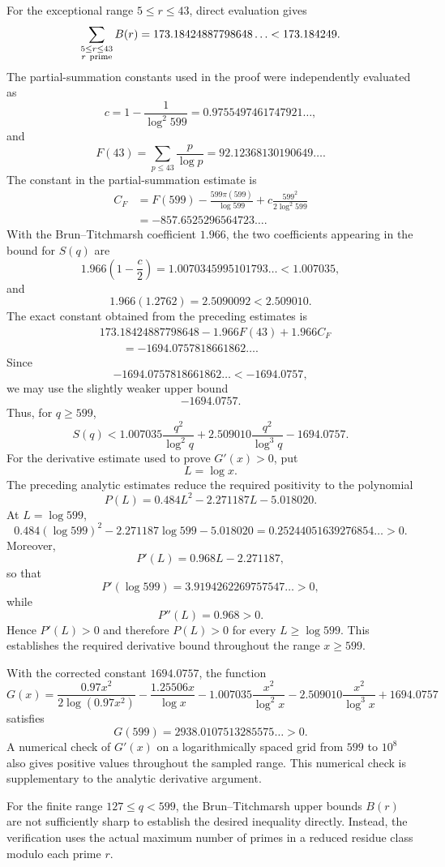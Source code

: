 \documentclass[11pt,a4paper]{article}
\theoremstyle{definition}
\theoremstyle{remark}
\begin{document}
For the exceptional range $5\le r\le43$, direct evaluation gives
\[
\sum_{\substack{5\le r\le43\\r\ {\rm prime}}}B(r)
=
173.18424887798648\ldots
<
173.184249.
\]
The partial-summation constants used in the proof were independently
evaluated as
\[
c
=
1-\frac1{\log^2 599}
=
0.9755497461747921\ldots,
\]
and
\[
F(43)
=
\sum_{p\le43}\frac p{\log p}
=
92.12368130190649\ldots.
\]
The constant in the partial-summation estimate is
\[
\begin{aligned}
C_F
&=
F(599)
-\frac{599\pi(599)}{\log599}
+
c\frac{599^2}{2\log^2 599}\\
&=
-857.6525296564723\ldots.
\end{aligned}
\]
With the Brun--Titchmarsh coefficient $1.966$, the two coefficients
appearing in the bound for $S(q)$ are
\[
1.966\left(1-\frac c2\right)
=
1.0070345995101793\ldots
<
1.007035,
\]
and
\[
1.966(1.2762)
=
2.5090092
<
2.509010.
\]
The exact constant obtained from the preceding estimates is
\[
\begin{aligned}
&173.18424887798648
-1.966F(43)
+1.966C_F\\
&\qquad=
-1694.0757818661862\ldots.
\end{aligned}
\]
Since
\[
-1694.0757818661862\ldots<-1694.0757,
\]
we may use the slightly weaker upper bound
\[
-1694.0757.
\]
Thus, for $q\ge599$,
\[
S(q)
<
1.007035\frac{q^2}{\log^2q}
+
2.509010\frac{q^2}{\log^3q}
-1694.0757.
\]
For the derivative estimate used to prove $G'(x)>0$, put
\[
L=\log x.
\]
The preceding analytic estimates reduce the required positivity to
the polynomial
\[
P(L)
=
0.484L^2-2.271187L-5.018020.
\]
At $L=\log599$,
\[
0.484(\log599)^2
-2.271187\log599
-5.018020
=
0.25244051639276854\ldots
>0.
\]
Moreover,
\[
P'(L)
=
0.968L-2.271187,
\]
so that
\[
P'(\log599)
=
3.9194262269757547\ldots
>0,
\]
while
\[
P''(L)=0.968>0.
\]
Hence $P'(L)>0$ and therefore $P(L)>0$ for every
$L\ge\log599$. This establishes the required derivative bound
throughout the range $x\ge599$.

With the corrected constant $1694.0757$, the function
\[
G(x)=
\frac{0.97x^2}{2\log(0.97x^2)}
-\frac{1.25506x}{\log x}
-1.007035\frac{x^2}{\log^2x}
-2.509010\frac{x^2}{\log^3x}
+1694.0757
\]
satisfies
\[
G(599)
=
2938.0107513285575\ldots
>0.
\]
A numerical check of $G'(x)$ on a logarithmically spaced grid from
$599$ to $10^8$ also gives positive values throughout the sampled
range. This numerical check is supplementary to the analytic
derivative argument.

For the finite range $127\le q<599$, the Brun--Titchmarsh upper
bounds $B(r)$ are not sufficiently sharp to establish the desired
inequality directly. Instead, the verification uses the actual
maximum number of primes in a reduced residue class modulo each
prime $r$.
\end{document}
